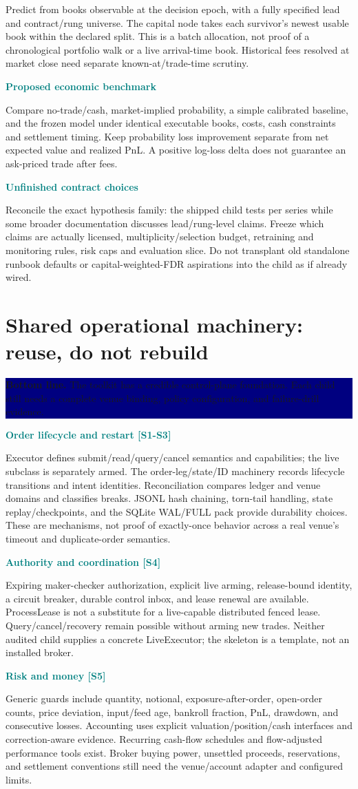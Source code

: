 \documentclass[10pt,letterpaper]{article}
\newcommand{\bl}[1]{\noindent\colorbox{navy}{\parbox{\dimexpr\linewidth-2\fboxsep}{\color{white}\textbf{Bottom line.} #1}}\par\medskip}
\newcommand{\topic}[2]{\clearpage\section{#1}\bl{#2}}
\newcommand{\sub}[1]{\par\textbf{\textcolor{teal}{#1}}\par}
\begin{document}
Predict from books observable at the decision epoch, with a fully specified lead and contract/rung universe. The capital node takes each survivor's newest usable book within the declared split. This is a batch allocation, not proof of a chronological portfolio walk or a live arrival-time book. Historical fees resolved at market close need separate known-at/trade-time scrutiny.
\sub{Proposed economic benchmark}
Compare no-trade/cash, market-implied probability, a simple calibrated baseline, and the frozen model under identical executable books, costs, cash constraints and settlement timing. Keep probability loss improvement separate from net expected value and realized PnL. A positive log-loss delta does not guarantee an ask-priced trade after fees.
\sub{Unfinished contract choices}
Reconcile the exact hypothesis family: the shipped child tests per series while some broader documentation discusses lead/rung-level claims. Freeze which claims are actually licensed, multiplicity/selection budget, retraining and monitoring rules, risk caps and evaluation slice. Do not transplant old standalone runbook defaults or capital-weighted-FDR aspirations into the child as if already wired.
\topic{Shared operational machinery: reuse, do not rebuild}{The toolkit has a credible control-plane foundation. Each child still needs a complete venue binding, policy configuration, and failure-drill evidence.}
\sub{Order lifecycle and restart [S1-S3]}
Executor defines submit/read/query/cancel semantics and capabilities; the live subclass is separately armed. The order-leg/state/ID machinery records lifecycle transitions and intent identities. Reconciliation compares ledger and venue domains and classifies breaks. JSONL hash chaining, torn-tail handling, state replay/checkpoints, and the SQLite WAL/FULL pack provide durability choices. These are mechanisms, not proof of exactly-once behavior across a real venue's timeout and duplicate-order semantics.
\sub{Authority and coordination [S4]}
Expiring maker-checker authorization, explicit live arming, release-bound identity, a circuit breaker, durable control inbox, and lease renewal are available. ProcessLease is not a substitute for a live-capable distributed fenced lease. Query/cancel/recovery remain possible without arming new trades. Neither audited child supplies a concrete LiveExecutor; the skeleton is a template, not an installed broker.
\sub{Risk and money [S5]}
Generic guards include quantity, notional, exposure-after-order, open-order counts, price deviation, input/feed age, bankroll fraction, PnL, drawdown, and consecutive losses. Accounting uses explicit valuation/position/cash interfaces and correction-aware evidence. Recurring cash-flow schedules and flow-adjusted performance tools exist. Broker buying power, unsettled proceeds, reservations, and settlement conventions still need the venue/account adapter and configured limits.
\end{document}

